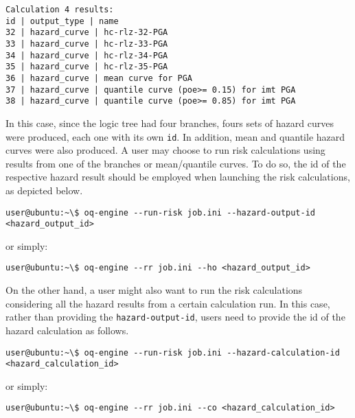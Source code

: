 \begin{Verbatim}[frame=single, commandchars=\\\{\}, samepage=true]
Calculation 4 results:
id | output_type | name
32 | hazard_curve | hc-rlz-32-PGA
33 | hazard_curve | hc-rlz-33-PGA
34 | hazard_curve | hc-rlz-34-PGA
35 | hazard_curve | hc-rlz-35-PGA
36 | hazard_curve | mean curve for PGA
37 | hazard_curve | quantile curve (poe>= 0.15) for imt PGA
38 | hazard_curve | quantile curve (poe>= 0.85) for imt PGA
\end{Verbatim}

In this case, since the logic tree had four branches, fours sets of hazard curves were produced, each one with its own \verb+id+. In addition, mean and quantile hazard curves were also produced. A user may choose to run risk calculations using results from one of the branches or mean/quantile curves. To do so, the id of the respective hazard result should be employed when launching the risk calculations, as depicted below.

\begin{Verbatim}[frame=single, commandchars=\\\{\}, samepage=true]
user@ubuntu:~\$ oq-engine --run-risk job.ini --hazard-output-id
<hazard_output_id>
\end{Verbatim}

or simply:

\begin{Verbatim}[frame=single, commandchars=\\\{\}, samepage=true]
user@ubuntu:~\$ oq-engine --rr job.ini --ho <hazard_output_id>
\end{Verbatim}

On the other hand, a user might also want to run the risk calculations considering all the hazard results from a certain calculation run. In this case, rather than providing the \verb+hazard-output-id+, users need to provide the id of the hazard calculation as follows.

\begin{Verbatim}[frame=single, commandchars=\\\{\}, samepage=true]
user@ubuntu:~\$ oq-engine --run-risk job.ini --hazard-calculation-id
<hazard_calculation_id>
\end{Verbatim}

or simply:

\begin{Verbatim}[frame=single, commandchars=\\\{\}, samepage=true]
user@ubuntu:~\$ oq-engine --rr job.ini --co <hazard_calculation_id>
\end{Verbatim}

